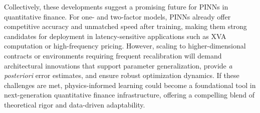 \documentclass[12pt]{report} %
\theoremstyle{plain} %
\theoremstyle{definition} %
\theoremstyle{remark} %
\begin{document}
Collectively, these developments suggest a promising future for PINNs in quantitative finance. For one- and two-factor models, 
PINNs already offer competitive accuracy and unmatched speed after training, making them strong candidates for deployment in 
latency-sensitive applications such as XVA computation or high-frequency pricing. However, scaling to higher-dimensional contracts 
or environments requiring frequent recalibration will demand architectural innovations that support parameter generalization, 
provide \emph{a posteriori} error estimates, and ensure robust optimization dynamics. If these challenges are met, physics-informed 
learning could become a foundational tool in next-generation quantitative finance infrastructure, offering a compelling blend of 
theoretical rigor and data-driven adaptability.


\clearpage
{}

\printbibliography
\end{document}
